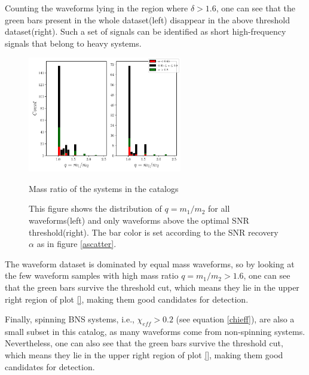 Counting the waveforms lying in the region where $\delta>1.6$, one can see that the green bars present in the whole dataset(left) disappear in the above threshold dataset(right). Such a set of signals can be identified as short high-frequency signals that belong to heavy systems. 

\begin{figure}[hbt!]
\begin{center}
\includegraphics[width=0.6\textwidth, angle=0]{images/Data_analysis/results/alpha_qhist.pdf}
\captionsetup{width=0.8\textwidth}
\caption{Mass ratio of the systems in the catalogs}
\caption*{This figure shows the distribution of $q=m_1/m_2$ for all waveforms(left) and only waveforms above the optimal SNR threshold(right). The bar color is set according to the SNR recovery $\alpha$ as in figure \ref{ascatter}.}
\label{aqhist}
\end{center}
\end{figure}

The waveform dataset is dominated by equal mass waveforms, so by looking at the few waveform samples with high mass ratio $q=m_1/m_2>1.6$, one can see that the green bars survive the threshold cut, which means they lie in the upper right region of plot \ref{}, making them good candidates for detection.
 

\newpage

Finally, spinning BNS systems, i.e., $\chi_{eff}>0.2$ (see equation \ref{chieff}), are also a small subset in this catalog, as many waveforms come from non-spinning systems. Nevertheless, one can also see that the green bars survive the threshold cut, which means they lie in the upper right region of plot \ref{}, making them good candidates for detection.

